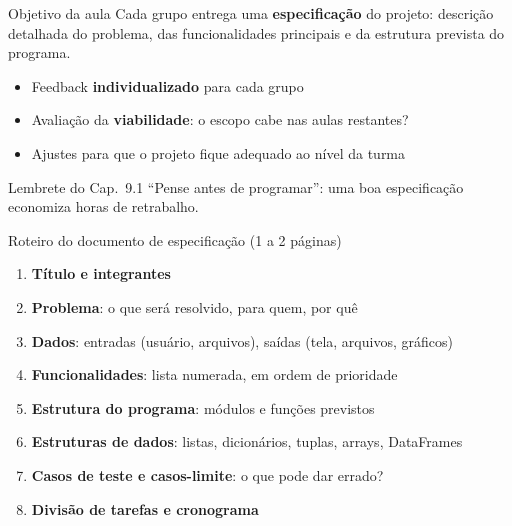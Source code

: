 \documentclass[aspectratio=169,10pt,t]{beamer}
\begin{document}
\capa

\begin{frame}{Objetivo da aula}
  Cada grupo entrega uma \textbf{especificação} do projeto: descrição detalhada do problema, das funcionalidades principais e da estrutura prevista do programa.
  \vspace{1ex}
  \begin{itemize}
    \item Feedback \textbf{individualizado} para cada grupo
    \item Avaliação da \textbf{viabilidade}: o escopo cabe nas aulas restantes?
    \item Ajustes para que o projeto fique adequado ao nível da turma
  \end{itemize}
  \begin{exampleblock}{Lembrete do Cap.~9.1}
    ``Pense antes de programar'': uma boa especificação economiza horas de retrabalho.
  \end{exampleblock}
\end{frame}

\begin{frame}{Roteiro do documento de especificação (1 a 2 páginas)}
  \begin{enumerate}
    \item \textbf{Título e integrantes}
    \item \textbf{Problema}: o que será resolvido, para quem, por quê
    \item \textbf{Dados}: entradas (usuário, arquivos), saídas (tela, arquivos, gráficos)
    \item \textbf{Funcionalidades}: lista numerada, em ordem de prioridade
    \item \textbf{Estrutura do programa}: módulos e funções previstos
    \item \textbf{Estruturas de dados}: listas, dicionários, tuplas, arrays, DataFrames
    \item \textbf{Casos de teste e casos-limite}: o que pode dar errado?
    \item \textbf{Divisão de tarefas e cronograma}
  \end{enumerate}
\end{frame}
\end{document}
